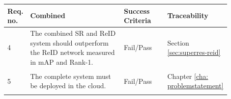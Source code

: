 \begin{table}[H]
\begin{tabular}{|>{\raggedright\arraybackslash}p{0.1\linewidth}|>{\raggedright\arraybackslash}p{0.45\linewidth}|>{\raggedright\arraybackslash}p{0.2\linewidth}|>{\raggedright\arraybackslash}p{0.15\linewidth}|}\hline
\rowcolor[HTML]{D8E9F7} 
\textbf{Req. no.}& \textbf{Combined}& \textbf{Success Criteria}& \textbf{Traceability}              \\\hline
 \hypertarget{req:4}{4}& The combined \acs{SR} and \acs{ReID} system should outperform the \acs{ReID} network measured in \acs{mAP} and Rank-1.& Fail/Pass&Section \ref{sec:superres-reid}\\\hline
 \hypertarget{req:5}{5}& The complete system must be deployed in the cloud.& Fail/Pass&Chapter \ref{cha: problemstatement}\\\hline\end{tabular}
\end{table}
